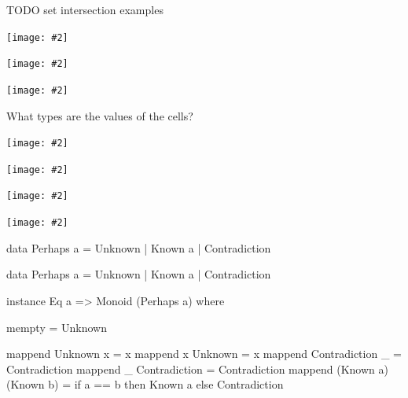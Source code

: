 \documentclass[usenames,dvipsnames,svgnames,table,aspectratio=1610,mathserif]{beamer}
\newcommand{\nl}{\vspace{\baselineskip}}
\newcommand{\textslide}[1]{{
\begin{frame}
\begin{center}

#1

\end{center}
\end{frame}
}}
\newcommand{\imageslide}[2][1]{{
\begin{frame}\begin{center}
\texttt{[image: \#2]}
\end{center}\end{frame}
}}
\newcommand{\imageslideleft}[2][1]{{
\begin{frame}
\texttt{[image: \#2]}
\end{frame}
}}
\begin{document}
\begin{frame}
TODO set intersection examples
\end{frame}


\imageslide[0.6]{doubleplus0.pdf}
\imageslide[0.6]{doubleplus1.pdf}
\imageslide[0.6]{doubleplus2.pdf}


\textslide{{\LARGE
What types are the values of the cells?
}}


\imageslide{cell1.pdf}
\imageslide{cell2.pdf}
\imageslide{cell3.pdf}
\imageslide{cell4.pdf}









\begin{frame}[fragile]
\begin{haskellcode}
data Perhaps a = Unknown | Known a | Contradiction
\end{haskellcode}
\end{frame}

\begin{frame}[fragile]

\begin{haskellcode}
data Perhaps a = Unknown | Known a | Contradiction
\end{haskellcode}

\nl

\begin{haskellcode}
instance Eq a => Monoid (Perhaps a) where

  mempty = Unknown

  mappend Unknown x           = x
  mappend x       Unknown     = x
  mappend Contradiction _     = Contradiction
  mappend _     Contradiction = Contradiction
  mappend (Known a) (Known b) =
    if a == b
      then Known a
      else Contradiction
\end{haskellcode}

\end{frame}
\end{document}
